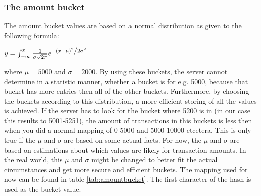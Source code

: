 \documentclass[a4paper]{article}
\begin{document}
        \subsubsection{The amount bucket}\label{sec:bucketamount}
        
        The amount bucket values are based on a normal distribution as given to the following formula:
        
        $y=\int_{-\infty}^x \frac{1}{{\sigma \sqrt {2\pi } }}e^{{{ - \left( {x - \mu } \right)^2 } \mathord{\left/ {\vphantom {{ - \left( {x - \mu } \right)^2 } {2\sigma ^2 }}} \right. \kern-\nulldelimiterspace} {2\sigma ^2 }}}$ 
        
        where $\mu = 5000$ and $\sigma = 2000$. By using these buckets, the server cannot determine in a statistic manner, whether a bucket is for e.g. 5000, because that bucket has more entries then all of the other buckets. Furthermore, by choosing the buckets according to this distribution, a more efficient storing of all the values is achieved. If the server has to look for the bucket where 5200 is in (in our case this results to 5001-5251), the amount of transactions in this buckets is less then when you did a normal mapping of 0-5000 and 5000-10000 etcetera. This is only true if the $\mu$ and $\sigma$ are based on some actual facts. For now, the $\mu$ and $\sigma$ are based on estimations about which values are likely for transaction amounts. In the real world, this $\mu$ and $\sigma$ might be changed to better fit the actual circumstances and get more secure and efficient buckets. The mapping used for now can be found in table \ref{tab:amountbucket}. The first character of the hash is used as the bucket value.
        
\end{document}
